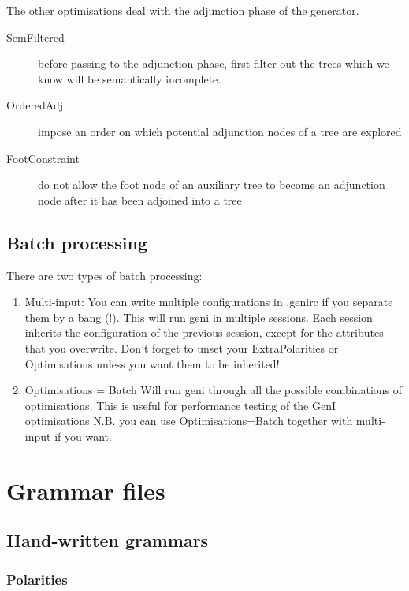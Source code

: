 \documentclass[11pt]{article}
\begin{document}
The other optimisations deal with the adjunction phase of the
generator.

\begin{description}
\item[SemFiltered] before passing to the adjunction phase,
                   first filter out the trees which we know
                   will be semantically incomplete.
\item[OrderedAdj] impose an order on which potential
                  adjunction nodes of a tree are explored
\item[FootConstraint] do not allow the foot node of an auxiliary tree to
                      become an adjunction node after it has been 
                      adjoined into a tree
\end{description}

\subsection{Batch processing}
There are two types of batch processing:
\begin{enumerate}
\item Multi-input:
      You can write multiple configurations in .genirc if you separate
      them by a bang (!).  This will run geni in multiple sessions.
      Each session inherits the configuration of the previous session,
      except for the attributes that you overwrite.  Don't forget to
      unset your ExtraPolarities or Optimisations unless you want them
      to be inherited!
\item Optimisations = Batch 
      Will run geni through all the possible combinations of
      optimisations.  This is useful for performance testing
      of the GenI optimisations
      N.B. you can use Optimisations=Batch together with multi-input
      if you want.
\end{enumerate}

\section{Grammar files}

\subsection{Hand-written grammars}

\subsubsection{Polarities}
\end{document}
